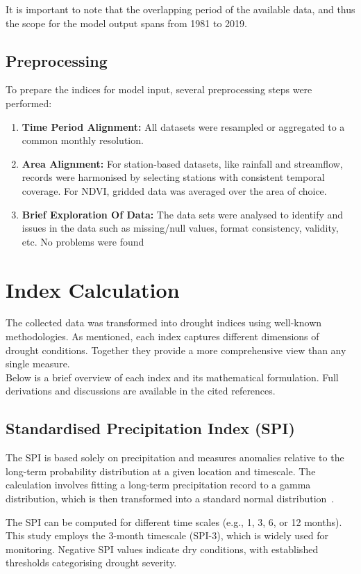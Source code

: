 It is important to note that the overlapping period of the available data, and thus the scope for the model output spans from 1981 to 2019.

\subsection{Preprocessing}
To prepare the indices for model input, several preprocessing steps were performed:  
\begin{enumerate}
    \item \textbf{Time Period Alignment:} All datasets were resampled or aggregated to a common monthly resolution.  
    \item \textbf{Area Alignment:} For station-based datasets, like rainfall and streamflow, records were harmonised by selecting stations with consistent temporal coverage. For NDVI, gridded data was averaged over the area of choice. 
    \item \textbf{Brief Exploration Of Data:} The data sets were analysed to identify and issues in the data such as missing/null values, format consistency, validity, etc. No problems were found
\end{enumerate}


\section{Index Calculation}
\label{sec:index-calc}
The collected data was transformed into drought indices using well-known methodologies. As mentioned, each index captures different dimensions of drought conditions. Together they provide a more comprehensive view than any single measure. \\
Below is a brief overview of each index and its mathematical formulation. Full derivations and discussions are available in the cited references.

\subsection{Standardised Precipitation Index (SPI)}

The SPI is based solely on precipitation and measures anomalies relative to the long-term probability distribution at a given location and timescale. The calculation involves fitting a long-term precipitation record to a gamma distribution, which is then transformed into a standard normal distribution~\cite{spi_seminal_paper}.

The SPI can be computed for different time scales (e.g., 1, 3, 6, or 12 months). This study employs the 3-month timescale (SPI-3), which is widely used for monitoring. Negative SPI values indicate dry conditions, with established thresholds categorising drought severity.

